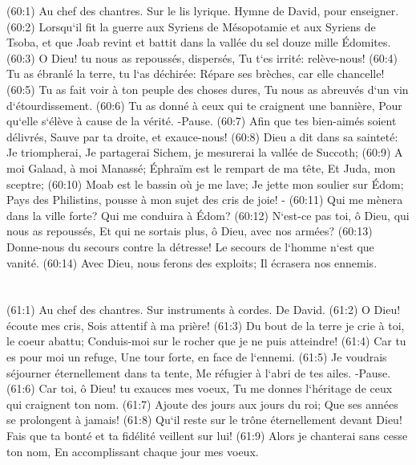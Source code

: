 \verse (60:1) Au chef des chantres. Sur le lis lyrique. Hymne de David, pour enseigner. (60:2) Lorsqu`il fit la guerre aux Syriens de Mésopotamie et aux Syriens de Tsoba, et que Joab revint et battit dans la vallée du sel douze mille Édomites. (60:3) O Dieu! tu nous as repoussés, dispersés, Tu t`es irrité: relève-nous! 
\verse (60:4) Tu as ébranlé la terre, tu l`as déchirée: Répare ses brèches, car elle chancelle! 
\verse (60:5) Tu as fait voir à ton peuple des choses dures, Tu nous as abreuvés d`un vin d`étourdissement. 
\verse (60:6) Tu as donné à ceux qui te craignent une bannière, Pour qu`elle s`élève à cause de la vérité. -Pause. 
\verse (60:7) Afin que tes bien-aimés soient délivrés, Sauve par ta droite, et exauce-nous! 
\verse (60:8) Dieu a dit dans sa sainteté: Je triompherai, Je partagerai Sichem, je mesurerai la vallée de Succoth; 
\verse (60:9) A moi Galaad, à moi Manassé; Éphraïm est le rempart de ma tête, Et Juda, mon sceptre; 
\verse (60:10) Moab est le bassin où je me lave; Je jette mon soulier sur Édom; Pays des Philistins, pousse à mon sujet des cris de joie! - 
\verse (60:11) Qui me mènera dans la ville forte? Qui me conduira à Édom? 
\verse (60:12) N`est-ce pas toi, ô Dieu, qui nous as repoussés, Et qui ne sortais plus, ô Dieu, avec nos armées? 
\verse (60:13) Donne-nous du secours contre la détresse! Le secours de l`homme n`est que vanité. 
\verse (60:14) Avec Dieu, nous ferons des exploits; Il écrasera nos ennemis. 

\chapter{}

\verse (61:1) Au chef des chantres. Sur instruments à cordes. De David. (61:2) O Dieu! écoute mes cris, Sois attentif à ma prière! 
\verse (61:3) Du bout de la terre je crie à toi, le coeur abattu; Conduis-moi sur le rocher que je ne puis atteindre! 
\verse (61:4) Car tu es pour moi un refuge, Une tour forte, en face de l`ennemi. 
\verse (61:5) Je voudrais séjourner éternellement dans ta tente, Me réfugier à l`abri de tes ailes. -Pause. 
\verse (61:6) Car toi, ô Dieu! tu exauces mes voeux, Tu me donnes l`héritage de ceux qui craignent ton nom. 
\verse (61:7) Ajoute des jours aux jours du roi; Que ses années se prolongent à jamais! 
\verse (61:8) Qu`il reste sur le trône éternellement devant Dieu! Fais que ta bonté et ta fidélité veillent sur lui! 
\verse (61:9) Alors je chanterai sans cesse ton nom, En accomplissant chaque jour mes voeux. 

